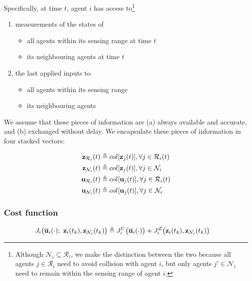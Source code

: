Specifically, at time $t$, agent $i$ has access to\footnote{Although
    $\mathcal{N}_i \subseteq \mathcal{R}_i$, we make the distinction between
    the two because all agents $j \in \mathcal{R}_i$ need to avoid collision
    with agent $i$, but only agents $j' \in \mathcal{N}_i$ need to remain
    within the sensing range of agent $i$.}

\begin{enumerate}
  \item measurements of the states of
    \begin{itemize}
      \item all agents within its sensing range at time $t$
      \item its neighbouring agents at time $t$
      \end{itemize}
    \item the last applied inputs to
      \begin{itemize}
        \item all agents within its sensing range
        \item its neighbouring agents
      \end{itemize}
\end{enumerate}

We assume that these pieces of information are (a) always available and
accurate, and (b) exchanged without delay. We encapsulate these pieces of
information in four stacked vectors:

\begin{align}
  \bm{\mathbf{z}}_{\mathcal{R}_i}(t) &\triangleq col[\bm{\mathbf{z}}_j(t)], \forall j \in \mathcal{R}_i(t) \\
  \bm{\mathbf{z}}_{\mathcal{N}_i}(t) &\triangleq col[\bm{\mathbf{z}}_j(t)], \forall j \in \mathcal{N}_i \\
  \bm{\mathbf{u}}_{\mathcal{R}_i}(t) &\triangleq col[\bm{\mathbf{u}}_j(t)], \forall j \in \mathcal{R}_i(t) \\
  \bm{\mathbf{u}}_{\mathcal{N}_i}(t) &\triangleq col[\bm{\mathbf{u}}_j(t)], \forall j \in \mathcal{N}_i
\end{align}


\subsubsection{Cost function}

\begin{align}
  J_i \big(\overline{\bm{\mathbf{u}}}_i (\cdot);\ \bm{\mathbf{z}}_i(t_k), \bm{\mathbf{z}}_{\mathcal{N}_i}(t_k)\big) &\triangleq
    J_i^U \big(\overline{\bm{\mathbf{u}}}_i (\cdot) \big) +
    J_i^Z \big(\bm{\mathbf{z}}_i (t_k), \bm{\mathbf{z}}_{\mathcal{N}_i}(t_k)\big)
\end{align}

